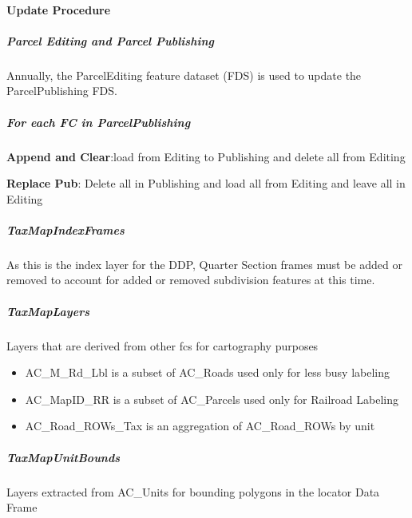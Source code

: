 \paragraph{Update Procedure}

\subparagraph{Parcel Editing and Parcel Publishing}
Annually, the ParcelEditing feature dataset (FDS) is used to update the ParcelPublishing FDS.


\subparagraph{For each FC in ParcelPublishing}

\noindent \textbf{Append and Clear}:load from Editing to Publishing and delete all from Editing

\noindent \textbf{Replace Pub}: Delete all in Publishing and load all from Editing and leave all in Editing

\begin{table}[htbp]
\centering
{}
%
\end{table}
\clearpage
\subparagraph{TaxMapIndexFrames}As this is the index layer for the DDP, Quarter Section frames must be added or removed to account for added or removed subdivision features at this time.
\subparagraph{TaxMapLayers}Layers that are derived from other fcs for cartography purposes
\begin{itemize}
\item AC\_M\_Rd\_Lbl is a subset of AC\_Roads used only for less busy labeling
\item AC\_MapID\_RR is a subset of AC\_Parcels used only for Railroad Labeling
\item AC\_Road\_ROWs\_Tax is an aggregation of AC\_Road\_ROWs by unit
\end{itemize}
\subparagraph{TaxMapUnitBounds}Layers extracted from AC\_Units for bounding polygons in the locator Data Frame
\clearpage
